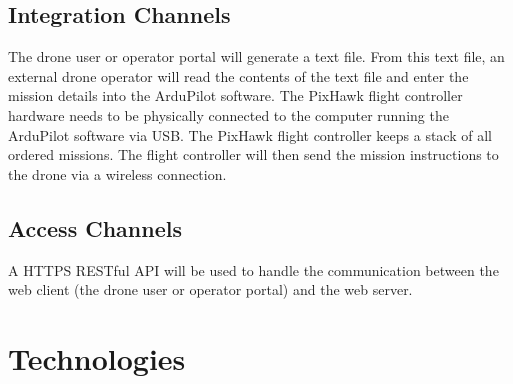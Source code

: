 \documentclass{article}
\begin{document}
	\subsection{Integration Channels}
	The drone user or operator portal will generate a text file. From this text file, an external drone operator will read the contents of the text file and enter the mission details into the ArduPilot software. The PixHawk flight controller hardware needs to be physically connected to the computer running the ArduPilot software via USB. The PixHawk flight controller keeps a stack of all ordered missions. The flight controller will then send the mission instructions to the drone via a wireless connection.
	\subsection{Access Channels}
	A HTTPS RESTful API will be used to handle the communication between the web client (the drone user or operator portal) and the web server. 
	\section{Technologies}%
	
	
	
	
	
	
\end{document}
